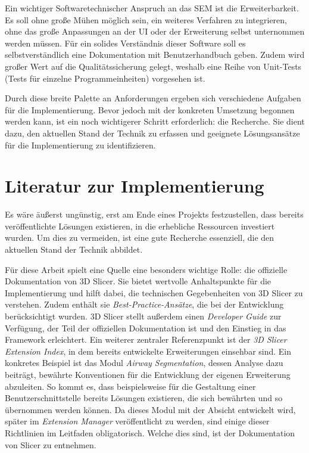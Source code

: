 Ein wichtiger Softwaretechnischer Anspruch an das \ac{SEM} ist die Erweiterbarkeit.
Es soll ohne große Mühen möglich sein, ein weiteres Verfahren zu integrieren,
ohne das große Anpassungen an der \ac{UI} oder der Erweiterung selbst unternommen
werden müssen. Für ein solides Verständnis dieser Software soll es
selbstverständlich eine Dokumentation mit Benutzerhandbuch geben. Zudem wird großer
Wert auf die Qualitätssicherung gelegt, weshalb eine Reihe von Unit-Tests (Tests
für einzelne Programmeinheiten) vorgesehen ist.

Durch diese breite Palette an Anforderungen ergeben sich verschiedene Aufgaben
für die Implementierung. Bevor jedoch mit der konkreten Umsetzung begonnen werden
kann, ist ein noch wichtigerer Schritt erforderlich: die Recherche. Sie dient
dazu, den aktuellen Stand der Technik zu erfassen und geeignete Lösungsansätze für
die Implementierung zu identifizieren.

\section{Literatur zur Implementierung}
Es wäre äußerst ungünstig, erst am Ende eines Projekts festzustellen, dass bereits
veröffentlichte Lösungen existieren, in die erhebliche Ressourcen investiert
wurden. Um dies zu vermeiden, ist eine gute Recherche essenziell, die den aktuellen
Stand der Technik abbildet.

Für diese Arbeit spielt eine Quelle eine besonders wichtige Rolle: die
offizielle Dokumentation von 3D Slicer. Sie bietet wertvolle Anhaltspunkte für die
Implementierung und hilft dabei, die technischen Gegebenheiten von 3D Slicer zu
verstehen. Zudem enthält sie \textit{Best-Practice-Ansätze}, die bei der Entwicklung
berücksichtigt wurden. 3D Slicer stellt außerdem einen \textit{Developer Guide} zur
Verfügung, der Teil der offiziellen Dokumentation ist und den Einstieg in das
Framework erleichtert. Ein weiterer zentraler Referenzpunkt ist der \textit{3D
Slicer Extension Index}, in dem bereits entwickelte Erweiterungen einsehbar sind.
Ein konkretes Beispiel ist das Modul \textit{Airway Segmentation}, dessen
Analyse dazu beiträgt, bewährte Konventionen für die Entwicklung der eigenen Erweiterung
abzuleiten. So kommt es, dass beispielsweise für die Gestaltung einer Benutzerschnittstelle
bereits Lösungen existieren, die sich bewährten und so übernommen werden können.
Da dieses Modul mit der Absicht entwickelt wird, später im \textit{Extension
Manager} veröffentlicht zu werden, sind einige dieser Richtlinien im Leitfaden
obligatorisch. Welche dies sind, ist der Dokumentation von Slicer zu entnehmen.

